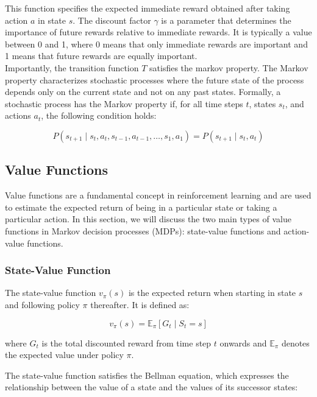 This function specifies the expected immediate reward obtained after taking action $a$ in state $s$. The discount factor $\gamma$ is a 
parameter that determines the importance of future rewards relative to immediate rewards. It is typically a value between 0 and 1, where 0 means that 
only immediate rewards are important and 1 means that future rewards are equally important. \\

Importantly, the transition function $T$ satisfies the markov property. The Markov property characterizes stochastic processes where the future state of the 
process depends only on the current state and not on any past states. Formally, a stochastic process has the Markov property if, 
for all time steps $t$, states $s_t$, and actions $a_t$, the following condition holds:

\begin{equation}
    P(s_{t+1} \mid s_t, a_t, s_{t-1}, a_{t-1}, \ldots, s_1, a_1) = P(s_{t+1} \mid s_t, a_t)
\end{equation}

\subsection{Value Functions}

Value functions are a fundamental concept in reinforcement learning and are used to estimate the expected return of being in a particular state or taking a particular action. In this section, we will discuss the two main types of value functions in Markov decision processes (MDPs): state-value functions and action-value functions.

\subsubsection{State-Value Function}

The state-value function $v_{\pi}(s)$ is the expected return when starting in state $s$ and following policy $\pi$ thereafter. It is defined as:

\begin{equation}
v_{\pi}(s) = \mathbb{E}_{\pi}\left[G_t \mid S_t = s\right]
\end{equation}

where $G_t$ is the total discounted reward from time step $t$ onwards and $\mathbb{E}_{\pi}$ denotes the expected value under policy $\pi$.

The state-value function satisfies the Bellman equation, which expresses the relationship between the value of a state and the values of its successor states:

